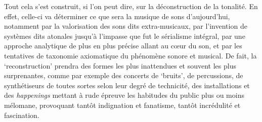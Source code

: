 \documentclass{article}
\begin{document}
Tout cela s'est construit, si l'on peut dire, sur la déconstruction de la tonalité. En effet, celle-ci va déterminer ce que sera la musique de sons d'aujourd'hui, notamment  par la valorisation des sons dits extra-musicaux, par l'invention de systèmes dits atonales jusqu'à l'impasse que fut le sérialisme intégral, par une approche analytique de plus en plus précise allant au cœur du son, et par les tentatives de taxonomie axiomatique du phénomène sonore et musical. De fait, la `reconstruction' prendra des formes les plus inattendues et souvent les plus surprenantes, comme par exemple des concerts de `bruits', de percussions, de synthétiseurs de toutes sortes selon leur degré de technicité, des installations et des \textit{happenings} mettant à rude épreuve les habitudes du public plus ou moins mélomane, provoquant tantôt indignation et fanatisme, tantôt incrédulité et fascination. %


\bigskip
\end{document}
